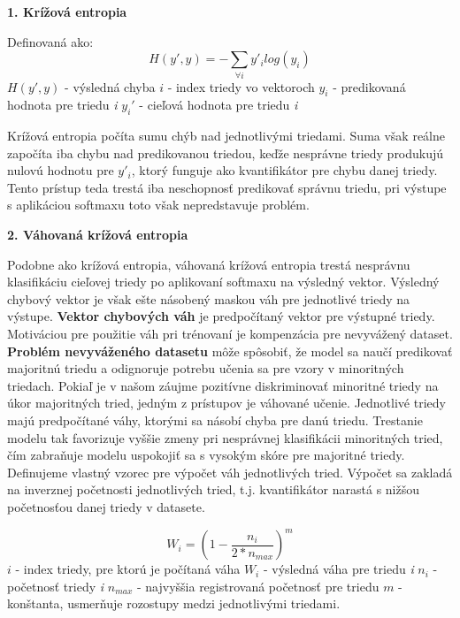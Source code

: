 \textbf{1. Krížová entropia}
\label{cross_entropy}

Definovaná ako:
$$H(y',y) = -\sum_{\forall i} y'_i log(y_i)$$
$H(y',y)$ - výsledná chyba\newline
$i$ - index triedy vo vektoroch\newline
$y_i$ - predikovaná hodnota pre triedu \textit{i}\newline
$y_i'$ - cieľová hodnota pre triedu \textit{i}\newline

Krížová entropia počíta sumu chýb nad jednotlivými triedami. Suma však reálne započíta iba chybu nad predikovanou triedou, keďže nesprávne triedy produkujú nulovú hodnotu pre $y'_i$, ktorý funguje ako kvantifikátor pre chybu danej triedy. Tento prístup teda trestá iba neschopnosť predikovať správnu triedu, pri výstupe s aplikáciou softmaxu toto však nepredstavuje problém.

\textbf{2. Váhovaná krížová entropia}
\label{weighted_cross_entropy}

Podobne ako krížová entropia, váhovaná krížová entropia trestá nesprávnu klasifikáciu cieľovej triedy po aplikovaní softmaxu na výsledný vektor. Výsledný chybový vektor je však ešte násobený maskou váh pre jednotlivé triedy na výstupe.\newline
\textbf{Vektor chybových váh} je predpočítaný vektor pre výstupné triedy. Motiváciou pre použitie váh pri trénovaní je kompenzácia pre nevyvážený dataset. \textbf{Problém nevyváženého datasetu} môže spôsobiť, že model sa naučí predikovať majoritnú triedu a odignoruje potrebu učenia sa pre vzory v minoritných triedach. Pokiaľ je v našom záujme pozitívne diskriminovať minoritné triedy na úkor majoritných tried, jedným z prístupov je váhované učenie. Jednotlivé triedy majú predpočítané váhy, ktorými sa násobí chyba pre danú triedu. Trestanie modelu tak favorizuje vyššie zmeny pri nesprávnej klasifikácii minoritných tried, čím zabraňuje modelu uspokojiť sa s vysokým skóre pre majoritné triedy.\newline
Definujeme vlastný vzorec pre výpočet váh jednotlivých tried. Výpočet sa zakladá na inverznej početnosti jednotlivých tried, t.j. kvantifikátor narastá s nižšou početnosťou danej triedy v datasete.

$$ W_i = (1 - \frac{n_i}{2*n_{max}})^m $$
$i$ - index triedy, pre ktorú je počítaná váha\newline
$W_i$ - výsledná váha pre triedu \textit{i}\newline
$n_i$ - početnosť triedy \textit{i}\newline
$n_{max}$ - najvyššia registrovaná početnosť pre triedu\newline
$m$ - konštanta, usmerňuje rozostupy medzi jednotlivými triedami. \newline 

